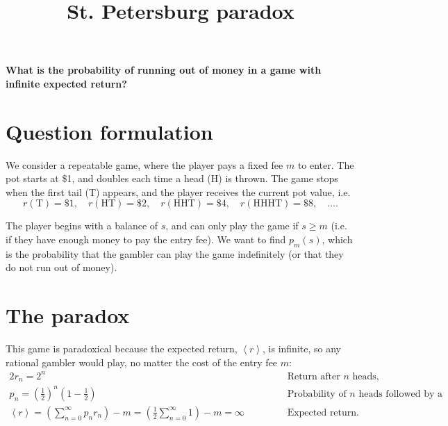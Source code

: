 \documentclass[a4paper,11pt]{article}
\title{St. Petersburg paradox}
\subtitle{}
\newcommand{\avg}[1]{\left\langle #1 \right\rangle}
\begin{document}
\maketitlebox

\textbf{What is the probability of running out of money in a game with infinite expected return?}

\section*{Question formulation}
We consider a repeatable game, where the player pays a fixed fee $m$ to enter.
The pot starts at \$1, and doubles each time a head (H) is thrown.
The game stops when the first tail (T) appears, and the player receives the current pot value, i.e.
\begin{equation}
r(\text{T}) = \$1, \quad r(\text{HT}) = \$2, \quad r(\text{HHT}) = \$4, \quad r(\text{HHHT}) = \$8, \quad \dots. \nonumber
\end{equation}

The player begins with a balance of $s$, and can only play the game if $s \ge m$ (i.e. if they have enough money to pay the entry fee).
We want to find $p_m(s)$, which is the probability that the gambler can play the game indefinitely (or that they do not run out of money).

\section*{The paradox}
This game is paradoxical because the expected return, $\avg{r}$, is infinite, so any rational gambler would play, no matter the cost of the entry fee $m$:
\begin{alignat*}{2}
r_n = 2^n &
&&\text{Return after $n$ heads,} \\
p_n = \left(\frac{1}{2}\right)^n\left(1-\frac{1}{2}\right)& \qquad
&& \text{Probability of $n$ heads followed by a tail,} \\
\avg{r} = \left(\sum_{n=0}^\infty p_n r_n\right) - m = \left(\frac{1}{2} \sum_{n=0}^\infty 1\right) - m = \infty & \qquad
&& \text{Expected return.}
\end{alignat*}
\end{document}
